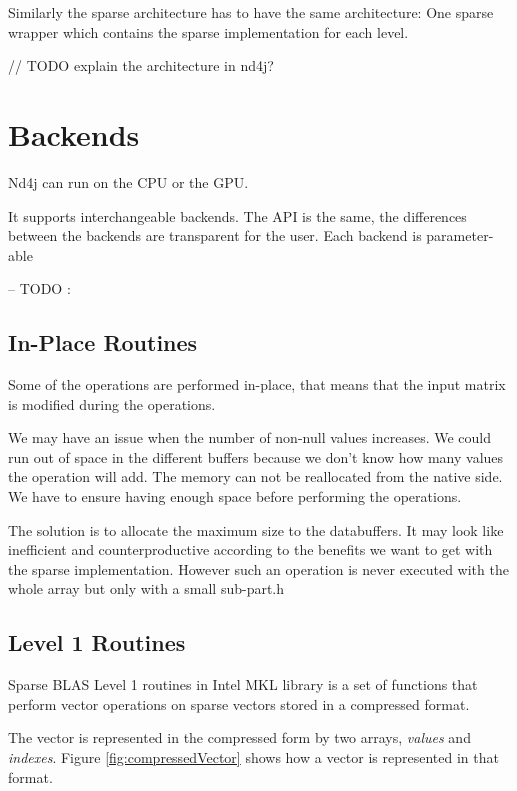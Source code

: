  Similarly the sparse architecture has to have the same architecture: One sparse wrapper which contains the sparse implementation for each level.
 
 // TODO explain the architecture in nd4j?
\section{Backends}

Nd4j can run on the CPU or the GPU. 

It supports interchangeable backends. The API is the same, the differences between the backends are transparent for the user.
Each backend is parameter-able 

-- TODO : 


\subsection{In-Place Routines}
Some of the operations are performed in-place, that means that the input matrix is modified during the operations.

We may have an issue when the number of non-null values increases. We could run out of space in the different buffers because we don't know how many values the operation will add. The memory can not be reallocated from the native side. We have to ensure having enough space before performing the operations.

The solution is to allocate the maximum size to the databuffers. It may look like inefficient and counterproductive according to the benefits we want to get with the sparse implementation. However such an operation is never executed with the whole array but only with a small sub-part.h

\subsection{Level 1 Routines}

Sparse BLAS Level 1 routines in Intel MKL library \cite{mkllvl1} is a set of functions that perform vector operations on sparse vectors stored in a compressed format.	

The vector is represented in the compressed form by two arrays, \textit{values} and \textit{indexes}. Figure \ref{fig:compressedVector} shows how a vector is represented in that format.

